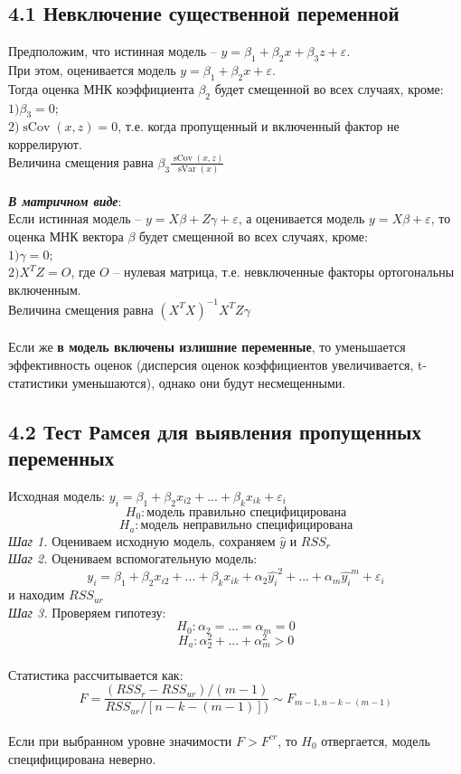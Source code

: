 \documentclass[a0,final]{a0poster}
\DeclareMathOperator{\sVar}{sVar}
\DeclareMathOperator{\sCov}{sCov}
\begin{document}
\begin{multicols}{4}
\subsection*{4.1 Невключение существенной переменной}
Предположим, что истинная модель -- $y = \beta_1 + \beta_2x + \beta_3z + \varepsilon$. \\
При этом, оценивается модель $y = \beta_1 + \beta_2x + \varepsilon$.\\
Тогда оценка МНК коэффициента $\beta_2$ будет смещенной во всех случаях, кроме: \\
$1) \beta_3 = 0;$\\
$2) \sCov(x, z) = 0$, т.е. когда пропущенный и включенный фактор не коррелируют. \\
Величина смещения равна $\beta_3\frac{\sCov(x, z)}{\sVar(x)}$\\ \\
\textbf{\textit{В матричном виде}}: \\
Если истинная модель -- $y = X\beta + Z\gamma + \varepsilon$, а оценивается модель $y = X\beta + \varepsilon$, то оценка МНК вектора $\beta$ будет смещенной во всех случаях, кроме: \\
$1) \gamma = 0;$\\
$2) X^TZ = O$, где $O$ -- нулевая матрица, т.е. невключенные факторы ортогональны включенным.\\
Величина смещения равна $(X^TX)^{-1}X^TZ\gamma$ \\
\\
Если же \textbf{в модель включены излишние переменные}, то уменьшается эффективность оценок (дисперсия оценок коэффициентов увеличивается, t-статистики уменьшаются), однако они будут несмещенными.

\subsection*{4.2 Тест Рамсея для выявления пропущенных переменных}
Исходная модель: $y_i = \beta_1 + \beta_2x_{i2} + ... + \beta_kx_{ik} +\varepsilon_i$ \\
\[H_0: \text{модель правильно специфицирована} \]
\[H_a: \text{модель неправильно специфицирована} \]
\textit{Шаг 1.} Оцениваем исходную модель, сохраняем $\hat{y}$ и $RSS_{r}$ \\
\textit{Шаг 2.} Оцениваем вспомогательную модель:
\[y_i = \beta_1 + \beta_2x_{i2} + ... + \beta_kx_{ik} + \alpha_2\hat{y_i}^2 + ... + \alpha_m\hat{y_i}^m +\varepsilon_i\]
и находим $RSS_{ur}$ \\
\textit{Шаг 3.} Проверяем гипотезу:
\[H_0: \alpha_2 = ... = \alpha_m = 0\]
\[H_a: \alpha_2^2 + ... + \alpha_m^2 > 0 \]
\\
Статистика рассчитывается как:
\[F = \frac{(RSS_r - RSS_{ur})/(m-1)}{RSS_{ur}/[n-k-(m-1)])} \sim F_{m-1, n-k-(m-1)}\]
\\
Если при выбранном уровне значимости $F>F^{cr}$, то $H_0$ отвергается, модель специфицирована неверно.


\end{multicols}
\end{document}
